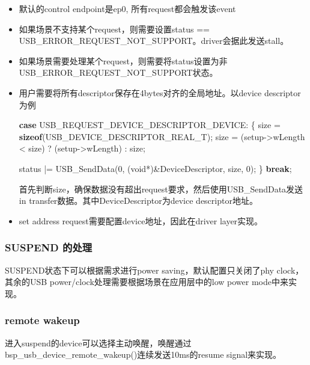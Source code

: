 \documentclass[
  12pt,
]{book}
\newenvironment{Shaded}{\begin{snugshade}}{\end{snugshade}}
\newcommand{\ControlFlowTok}[1]{\textcolor[rgb]{0.13,0.29,0.53}{\textbf{#1}}}
\newcommand{\DataTypeTok}[1]{\textcolor[rgb]{0.13,0.29,0.53}{#1}}
\newcommand{\DecValTok}[1]{\textcolor[rgb]{0.00,0.00,0.81}{#1}}
\newcommand{\KeywordTok}[1]{\textcolor[rgb]{0.13,0.29,0.53}{\textbf{#1}}}
\newcommand{\NormalTok}[1]{#1}
\begin{document}
\begin{itemize}
\item
  默认的control endpoint是ep0, 所有request都会触发该event
\item
  如果场景不支持某个request，则需要设置status == USB\_ERROR\_REQUEST\_NOT\_SUPPORT。driver会据此发送stall。
\item
  如果场景需要处理某个request，则需要将status设置为非USB\_ERROR\_REQUEST\_NOT\_SUPPORT状态。
\item
  用户需要将所有descriptor保存在4bytes对齐的全局地址。以device descriptor为例

\begin{Shaded}
\begin{Highlighting}[]
\ControlFlowTok{case}\NormalTok{ USB_REQUEST_DEVICE_DESCRIPTOR_DEVICE:}
\NormalTok{\{}
\NormalTok{  size = }\KeywordTok{sizeof}\NormalTok{(USB_DEVICE_DESCRIPTOR_REAL_T);}
\NormalTok{  size = (setup->wLength < size) ? (setup->wLength) : size;}

\NormalTok{  status |= USB_SendData(}\DecValTok{0}\NormalTok{, (}\DataTypeTok{void}\NormalTok{*)&DeviceDescriptor, size, }\DecValTok{0}\NormalTok{);}
\NormalTok{\}}
\ControlFlowTok{break}\NormalTok{;}
\end{Highlighting}
\end{Shaded}

  首先判断size，确保数据没有超出request要求，然后使用USB\_SendData发送in transfer数据。其中DeviceDescriptor为device descriptor地址。
\item
  set address request需要配置device地址，因此在driver layer实现。
\end{itemize}

\hypertarget{suspend-ux7684ux5904ux7406}{%
\subsubsection{SUSPEND 的处理}\label{suspend-ux7684ux5904ux7406}}

SUSPEND状态下可以根据需求进行power saving，默认配置只关闭了phy clock，其余的USB power/clock处理需要根据场景在应用层中的low power mode中来实现。

\hypertarget{remote-wakeup}{%
\subsubsection{remote wakeup}\label{remote-wakeup}}

进入suspend的device可以选择主动唤醒，唤醒通过bsp\_usb\_device\_remote\_wakeup()连续发送10ms的resume signal来实现。
\end{document}
